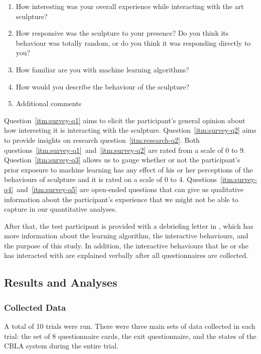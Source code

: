 \begin{enumerate}
	\item How interesting was your overall experience while interacting with the art 
	sculpture? \label{itm:survey-q1}
	\item How responsive was the sculpture to your presence?  Do you think its behaviour was totally random, or do you think it was responding directly to you? \label{itm:survey-q2}
	\item How familiar are you with machine learning algorithms? \label{itm:survey-q3}
	\item How would you describe the behaviour of the sculpture? \label{itm:survey-q4}
	\item Additional comments \label{itm:survey-q5}
\end{enumerate}

Question~\ref{itm:survey-q1} aims to elicit the participant's general opinion about how interesting it is interacting with the sculpture. Question~\ref{itm:survey-q2} aims to provide insights on research question~\ref{itm:research-q2}. Both questions~\ref{itm:survey-q1}~and~\ref{itm:survey-q2} are rated from a scale of 0 to 9. Question~\ref{itm:survey-q3} allows us to gauge whether or not the participant's prior exposure to machine learning has any effect of his or her perceptions of the behaviours of sculpture and it is rated on a scale of 0 to 4. Questions~\ref{itm:survey-q4}~and~\ref{itm:survey-q5} are open-ended questions that can give us qualitative information about the participant's experience that we might not be able to capture in our quantitative analyses. 


After that, the test participant is provided with a debriefing letter in , which has more information about the learning algorithm, the interactive behaviours, and the purpose of this study. In addition, the interactive behaviours that he or she has interacted with are explained verbally after all questionnaires are collected.

\subsection{Results and Analyses}


\subsubsection{Collected Data}

A total of 10 trials were run. There were three main sets of data collected in each trial: the set of 8 questionnaire cards, the exit questionnaire, and the states of the CBLA system during the entire trial.

